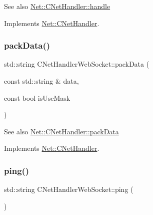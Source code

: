 \begin{DoxySeeAlso}{See also}
\mbox{\hyperlink{class_net_1_1_c_net_handler_a7bd761afe7eff3897b840db84f870135}{Net\+::\+C\+Net\+Handler\+::handle}} 
\end{DoxySeeAlso}


Implements \mbox{\hyperlink{class_net_1_1_c_net_handler_a7bd761afe7eff3897b840db84f870135}{Net\+::\+C\+Net\+Handler}}.

\mbox{\label{class_net_1_1_c_net_handler_web_socket_aa408c8c686da45c36969a7dcf7478daa}} 
\subsubsection{\texorpdfstring{pack\+Data()}{packData()}}
{\footnotesize\ttfamily std\+::string C\+Net\+Handler\+Web\+Socket\+::pack\+Data (\begin{DoxyParamCaption}\item[{const std\+::string \&}]{data,  }\item[{const bool}]{is\+Use\+Mask }\end{DoxyParamCaption})\hspace{0.3cm}{\ttfamily [virtual]}}

\begin{DoxySeeAlso}{See also}
\mbox{\hyperlink{class_net_1_1_c_net_handler_a9e8b6b44b05d2acb7b7cb28c57bedcb8}{Net\+::\+C\+Net\+Handler\+::pack\+Data}} 
\end{DoxySeeAlso}


Implements \mbox{\hyperlink{class_net_1_1_c_net_handler_a9e8b6b44b05d2acb7b7cb28c57bedcb8}{Net\+::\+C\+Net\+Handler}}.

\mbox{\label{class_net_1_1_c_net_handler_web_socket_aa19e13e42fa3a31ab8d8a8291af4b5e6}} 
\subsubsection{\texorpdfstring{ping()}{ping()}}
{\footnotesize\ttfamily std\+::string C\+Net\+Handler\+Web\+Socket\+::ping (\begin{DoxyParamCaption}{ }\end{DoxyParamCaption})\hspace{0.3cm}{\ttfamily [virtual]}}

